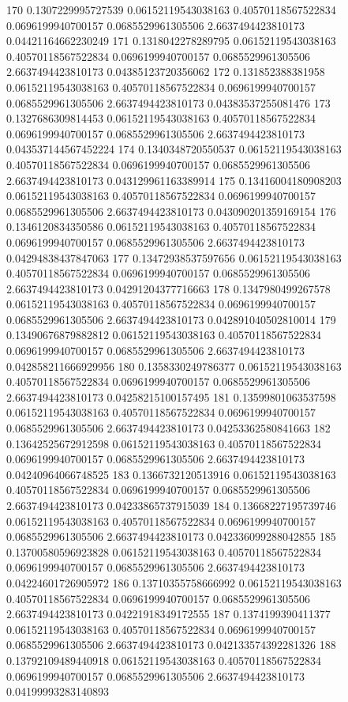 {170 0.1307229995727539 0.06152119543038163 0.40570118567522834 0.0696199940700157 0.0685529961305506 2.6637494423810173 0.04421164662230249
171 0.1318042278289795 0.06152119543038163 0.40570118567522834 0.0696199940700157 0.0685529961305506 2.6637494423810173 0.04385123720356062
172 0.131852388381958 0.06152119543038163 0.40570118567522834 0.0696199940700157 0.0685529961305506 2.6637494423810173 0.04383537255081476
173 0.1327686309814453 0.06152119543038163 0.40570118567522834 0.0696199940700157 0.0685529961305506 2.6637494423810173 0.043537144567452224
174 0.1340348720550537 0.06152119543038163 0.40570118567522834 0.0696199940700157 0.0685529961305506 2.6637494423810173 0.043129961163389914
175 0.13416004180908203 0.06152119543038163 0.40570118567522834 0.0696199940700157 0.0685529961305506 2.6637494423810173 0.043090201359169154
176 0.1346120834350586 0.06152119543038163 0.40570118567522834 0.0696199940700157 0.0685529961305506 2.6637494423810173 0.04294838437847063
177 0.13472938537597656 0.06152119543038163 0.40570118567522834 0.0696199940700157 0.0685529961305506 2.6637494423810173 0.04291204377716663
178 0.1347980499267578 0.06152119543038163 0.40570118567522834 0.0696199940700157 0.0685529961305506 2.6637494423810173 0.042891040502810014
179 0.13490676879882812 0.06152119543038163 0.40570118567522834 0.0696199940700157 0.0685529961305506 2.6637494423810173 0.042858211666929956
180 0.1358330249786377 0.06152119543038163 0.40570118567522834 0.0696199940700157 0.0685529961305506 2.6637494423810173 0.04258215100157495
181 0.13599801063537598 0.06152119543038163 0.40570118567522834 0.0696199940700157 0.0685529961305506 2.6637494423810173 0.04253362580841663
182 0.13642525672912598 0.06152119543038163 0.40570118567522834 0.0696199940700157 0.0685529961305506 2.6637494423810173 0.04240964066748525
183 0.1366732120513916 0.06152119543038163 0.40570118567522834 0.0696199940700157 0.0685529961305506 2.6637494423810173 0.04233865737915039
184 0.13668227195739746 0.06152119543038163 0.40570118567522834 0.0696199940700157 0.0685529961305506 2.6637494423810173 0.042336099288042855
185 0.13700580596923828 0.06152119543038163 0.40570118567522834 0.0696199940700157 0.0685529961305506 2.6637494423810173 0.04224601726905972
186 0.13710355758666992 0.06152119543038163 0.40570118567522834 0.0696199940700157 0.0685529961305506 2.6637494423810173 0.04221918349172555
187 0.1374199390411377 0.06152119543038163 0.40570118567522834 0.0696199940700157 0.0685529961305506 2.6637494423810173 0.042133574392281326
188 0.13792109489440918 0.06152119543038163 0.40570118567522834 0.0696199940700157 0.0685529961305506 2.6637494423810173 0.04199993283140893
}
